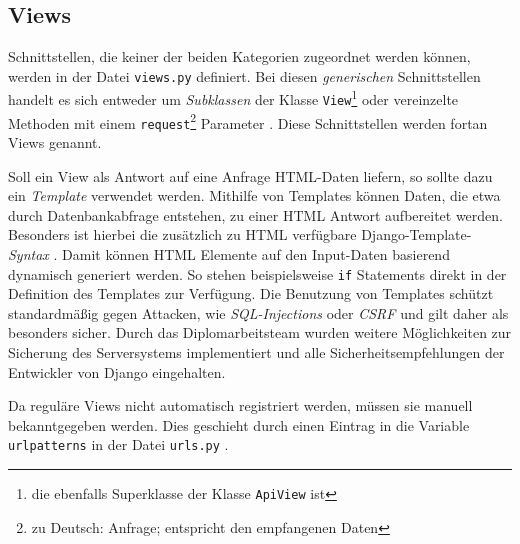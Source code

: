 \hypertarget{views}{%
\subsection{Views}\label{views}}

Schnittstellen, die keiner der beiden \oa{} Kategorien zugeordnet werden
können, werden in der Datei \texttt{views.py} definiert. Bei diesen
\emph{generischen}
Schnittstellen handelt es sich entweder um
\emph{Subklassen}
der Klasse \texttt{View}\footnote{die ebenfalls Superklasse der Klasse
  \texttt{ApiView} ist} \cite{django-doku-class-based-views} oder
vereinzelte Methoden mit einem \texttt{request}\footnote{zu Deutsch:
  Anfrage; entspricht den empfangenen Daten} Parameter
\cite{django-doku-views}. Diese Schnittstellen werden fortan Views
genannt.

Soll ein View als Antwort auf eine Anfrage HTML-Daten liefern, so sollte
dazu ein \emph{Template}
verwendet werden. Mithilfe von Templates können Daten, die etwa durch
Datenbankabfrage entstehen, zu einer HTML Antwort aufbereitet werden.
Besonders ist hierbei die zusätzlich zu HTML verfügbare
Django-Template-\emph{Syntax}
\cite{django-doku-template}. Damit können HTML Elemente auf den
Input-Daten basierend dynamisch generiert werden. So stehen
beispielsweise \texttt{if} Statements direkt in der Definition des
Templates zur Verfügung. Die Benutzung von Templates schützt
standardmäßig gegen Attacken, wie
\emph{SQL-Injections}
oder \emph{CSRF}
\cite{csrf}
und gilt daher als besonders sicher. Durch das Diplomarbeitsteam wurden
weitere Möglichkeiten zur Sicherung des Serversystems
\cite{django-doku-security} implementiert und alle
Sicherheitsempfehlungen der Entwickler von Django
\cite{django-doku-security} eingehalten.

Da reguläre Views nicht automatisch registriert werden, müssen sie
manuell bekanntgegeben werden. Dies geschieht durch einen Eintrag in die
Variable \texttt{urlpatterns} in der Datei \texttt{urls.py}
\cite{django-doku-urls}.

